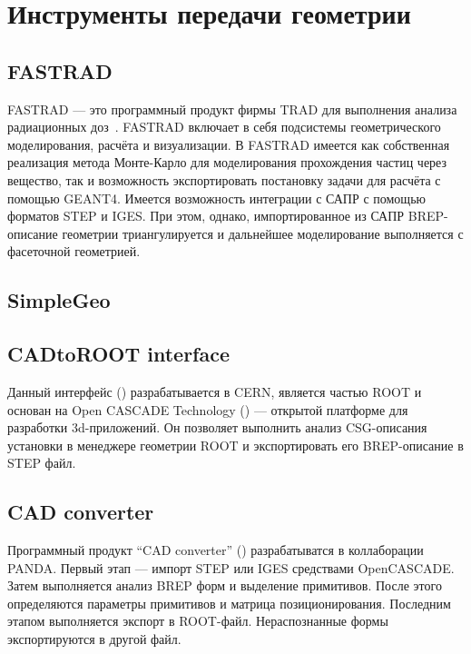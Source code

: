\section{Инструменты передачи геометрии}\label{sec:ExistSols}

\subsection{FASTRAD}\label{sec:secFastrad}


FASTRAD --- это программный продукт фирмы TRAD для выполнения анализа радиационных доз~\cite{FASTRAD}.
FASTRAD включает в себя подсистемы геометрического моделирования, расчёта и визуализации.
В FASTRAD имеется как собственная реализация метода Монте-Карло для моделирования прохождения частиц через вещество, так и возможность экспортировать постановку задачи для расчёта с помощью GEANT4.
Имеется возможность интеграции с САПР с помощью форматов STEP и IGES. При этом, однако, импортированное из САПР BREP-описание геометрии триангулируется и дальнейшее моделирование выполняется с фасеточной геометрией.

\subsection{SimpleGeo}\label{sec:secSimpleGeo}

\cite{SimpleGeo}


\subsection{CADtoROOT interface}\label{sec:secCinzia}

Данный интерфейс (\cite{Cinzia}) разрабатывается в CERN, является частью ROOT и основан на Open CASCADE Technology (\cite{OCCtech}) --- открытой платформе для разработки 3d-приложений. Он позволяет выполнить анализ CSG-описания установки в менеджере геометрии ROOT и экспортировать его BREP-описание в STEP файл.

\subsection{CAD converter}\label{sec:secTobias}

Программный продукт ``CAD converter'' (\cite{Tobias}) разрабатыватся в коллаборации PANDA.
Первый этап --- импорт STEP или IGES средствами OpenCASCADE.
Затем выполняется анализ BREP форм и выделение примитивов.
После этого определяются параметры примитивов и матрица позиционирования.
Последним этапом выполняется экспорт в ROOT-файл.
Нераспознанные формы экспортируются в другой файл.
